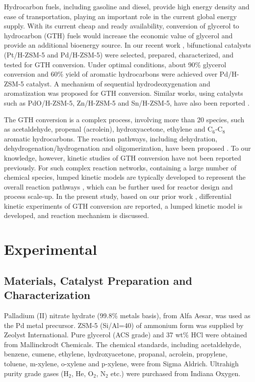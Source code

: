 \documentclass[journal=iecred,manuscript=article]{achemso}
\begin{document}
Hydrocarbon fuels, including gasoline and diesel, provide high energy density and ease of transportation, playing an important role in the current global energy supply. With its current cheap and ready availability, conversion of glycerol to hydrocarbon (GTH) fuels would increase the economic value of glycerol and provide an additional bioenergy source.
In our recent work \cite{Xiao2016},
bifunctional catalysts (Pt/H-ZSM-5 and Pd/H-ZSM-5) were selected, prepared, characterized, and tested for GTH conversion.
Under optimal conditions, about 90\% glycerol conversion and 60\% yield of aromatic hydrocarbons were achieved over Pd/H-ZSM-5 catalyst.
A mechanism of sequential hydrodeoxygenation and aromatization was proposed for GTH conversion.
Similar works, using catalysts such as PdO/H-ZSM-5, Zn/H-ZSM-5 and Sn/H-ZSM-5, have also been reported
\cite{Hoang2010, Jang2014, Xiao2015b, Tamiyakul2015, Wang2016}.

The GTH conversion is a complex process, involving more than 20 species,
such as acetaldehyde, propenal (acrolein), hydroxyacetone, ethylene and C$_6$-C$_8$ aromatic hydrocarbons.
The reaction pathways, including dehydration, dehydrogenation/hydrogenation and oligomerization, have been proposed
\cite{Tamiyakul2015, Wang2016}.
To our knowledge, however, kinetic studies of GTH conversion have not been reported previously.
For such complex reaction networks, containing a large number of chemical species,
lumped kinetic models are typically developed to represent the overall reaction pathways \cite{Nace1971, Jacob1976, Astarita1988, Keipert1995, Ranzi2001, Olcese2013},
which can be further used for reactor design and process scale-up. 
In the present study, based on our prior work \cite{Xiao2016},
differential kinetic experiments of GTH conversion are reported,
a lumped kinetic model is developed, and reaction mechanism is discussed.


\section{Experimental}

\subsection{Materials, Catalyst Preparation and Characterization}

Palladium (II) nitrate hydrate (99.8\%  metals  basis), from Alfa  Aesar, was used as the Pd metal precursor.
ZSM-5 (Si/Al=40) of ammonium form was supplied by Zeolyst International.
Pure glycerol (ACS grade) and 37 wt\% HCl were obtained from Mallinckrodt Chemicals.
The chemical standards, including acetaldehyde, benzene, cumene, ethylene, hydroxyacetone, propanal, acrolein, propylene, toluene,
m-xylene, o-xylene and p-xylene, were from Sigma Aldrich.
Ultrahigh purity grade gases (H$_2$, He, O$_2$, N$_2$ etc.) were purchased from Indiana Oxygen. 
\end{document}
